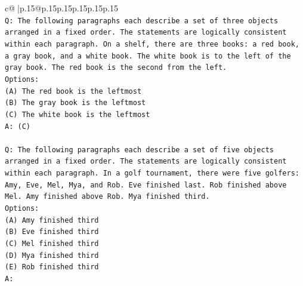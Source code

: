 \documentclass{article}
\begin{document}
{\begin{supertabular}{c@{$\;$}|p{.15\linewidth}@{}p{.15\linewidth}p{.15\linewidth}p{.15\linewidth}p{.15\linewidth}p{.15\linewidth}}
{{{\\ 
\texttt{Q: The following paragraphs each describe a set of three objects arranged in a fixed order. The statements are logically consistent within each paragraph. On a shelf, there are three books: a red book, a gray book, and a white book. The white book is to the left of the gray book. The red book is the second from the left.} \\
\texttt{Options:} \\
\texttt{(A) The red book is the leftmost} \\
\texttt{(B) The gray book is the leftmost} \\
\texttt{(C) The white book is the leftmost} \\
\texttt{A: (C)} \\
\\ 
\texttt{Q: The following paragraphs each describe a set of five objects arranged in a fixed order. The statements are logically consistent within each paragraph. In a golf tournament, there were five golfers: Amy, Eve, Mel, Mya, and Rob. Eve finished last. Rob finished above Mel. Amy finished above Rob. Mya finished third.} \\
\texttt{Options:} \\
\texttt{(A) Amy finished third} \\
\texttt{(B) Eve finished third} \\
\texttt{(C) Mel finished third} \\
\texttt{(D) Mya finished third} \\
\texttt{(E) Rob finished third} \\
\texttt{A:} \\
            }
        }
    }
     \\ \\


\end{supertabular}}
\end{document}
